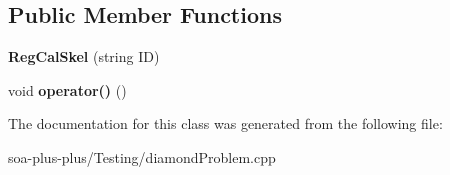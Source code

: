 \subsection*{Public Member Functions}
\begin{DoxyCompactItemize}
\item 
\hypertarget{class_reg_cal_skel_a1b19e749cd0fcedd0f8c81897b55b38d}{
{\bfseries RegCalSkel} (string ID)}
\label{class_reg_cal_skel_a1b19e749cd0fcedd0f8c81897b55b38d}

\item 
\hypertarget{class_reg_cal_skel_a87bd9aec5099ef9bb7eb51d7ced41652}{
void {\bfseries operator()} ()}
\label{class_reg_cal_skel_a87bd9aec5099ef9bb7eb51d7ced41652}

\end{DoxyCompactItemize}


The documentation for this class was generated from the following file:\begin{DoxyCompactItemize}
\item 
soa-\/plus-\/plus/Testing/diamondProblem.cpp\end{DoxyCompactItemize}

